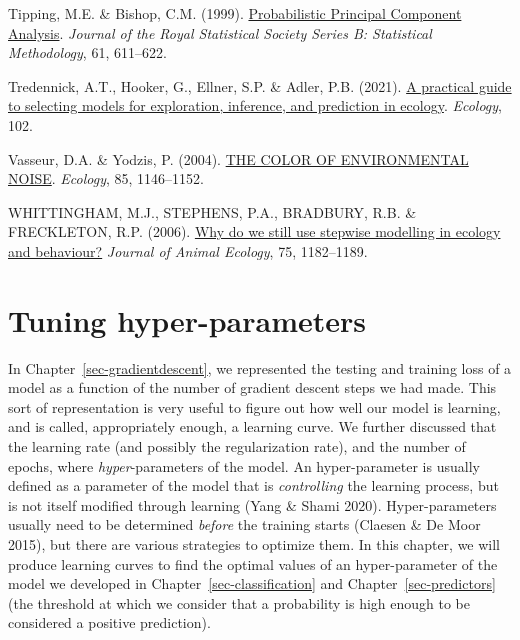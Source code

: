 \documentclass[
  letterpaper,
]{scrbook}
\newlength{\cslhangindent}
\newenvironment{CSLReferences}[2] %
 {\begin{list}{}{%
  \setlength{\itemindent}{0pt}
  \setlength{\leftmargin}{0pt}
  \setlength{\parsep}{0pt}
  \ifodd #1
   \setlength{\leftmargin}{\cslhangindent}
   \setlength{\itemindent}{-1\cslhangindent}
  \fi
  \setlength{\itemsep}{#2\baselineskip}}}
 {\end{list}}
\begin{document}
\begin{CSLReferences}{1}{0}
Tipping, M.E. \& Bishop, C.M. (1999).
\href{https://doi.org/10.1111/1467-9868.00196}{Probabilistic Principal
Component Analysis}. \emph{Journal of the Royal Statistical Society
Series B: Statistical Methodology}, 61, 611--622.

Tredennick, A.T., Hooker, G., Ellner, S.P. \& Adler, P.B. (2021).
\href{https://doi.org/10.1002/ecy.3336}{A practical guide to selecting
models for exploration, inference, and prediction in ecology}.
\emph{Ecology}, 102.

Vasseur, D.A. \& Yodzis, P. (2004).
\href{https://doi.org/10.1890/02-3122}{THE COLOR OF ENVIRONMENTAL
NOISE}. \emph{Ecology}, 85, 1146--1152.

WHITTINGHAM, M.J., STEPHENS, P.A., BRADBURY, R.B. \& FRECKLETON, R.P.
(2006). \href{https://doi.org/10.1111/j.1365-2656.2006.01141.x}{Why do
we still use stepwise modelling in ecology and behaviour?} \emph{Journal
of Animal Ecology}, 75, 1182--1189.

\end{CSLReferences}


\chapter{Tuning hyper-parameters}\label{sec-tuning}

In Chapter~\ref{sec-gradientdescent}, we represented the testing and
training loss of a model as a function of the number of gradient descent
steps we had made. This sort of representation is very useful to figure
out how well our model is learning, and is called, appropriately enough,
a learning curve. We further discussed that the learning rate (and
possibly the regularization rate), and the number of epochs, where
\emph{hyper}-parameters of the model. An hyper-parameter is usually
defined as a parameter of the model that is \emph{controlling} the
learning process, but is not itself modified through learning (Yang \&
Shami 2020). Hyper-parameters usually need to be determined
\emph{before} the training starts (Claesen \& De Moor 2015), but there
are various strategies to optimize them. In this chapter, we will
produce learning curves to find the optimal values of an hyper-parameter
of the model we developed in ­Chapter~\ref{sec-classification} and
Chapter~\ref{sec-predictors} (the threshold at which we consider that a
probability is high enough to be considered a positive prediction).
\end{document}
